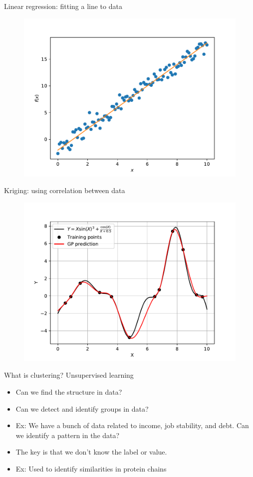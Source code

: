 \documentclass[10pt]{beamer}
\begin{document}
\begin{frame}{Linear regression: fitting a line to data}
\begin{figure}
\includegraphics[width=1.0\textwidth]{figs/linear_regression.pdf}
\end{figure}
\end{frame}

\begin{frame}{Kriging: using correlation between data}
\begin{figure}
\includegraphics[width=1.0\textwidth]{figs/Kriging.pdf}
\end{figure}
\end{frame}

\begin{frame}{What is clustering? Unsupervised learning}
\begin{itemize}
\item Can we find the structure in data?
\item Can we detect and identify groups in data?
\item Ex: We have a bunch of data related to income, job stability, and debt. Can we identify a pattern in the data?
\item The key is that we don't know the label or value. 
\item Ex: Used to identify similarities in protein chains 
\end{itemize}
\end{frame}
\end{document}
